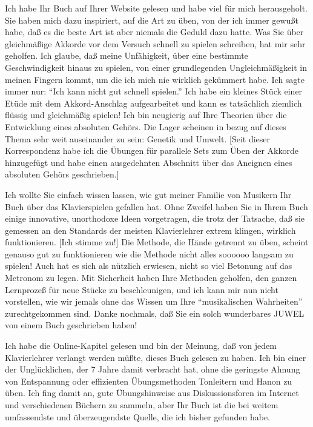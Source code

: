 \item \label{testimonials17}
Ich habe Ihr Buch auf Ihrer Website gelesen und habe viel für mich herausgeholt.
Sie haben mich dazu inspiriert, auf die Art zu üben, von der ich immer gewußt habe, daß es die beste Art ist aber niemals die Geduld dazu hatte.
Was Sie über gleichmäßige Akkorde vor dem Versuch schnell zu spielen schreiben, hat mir sehr geholfen.
Ich glaube, daß meine Unfähigkeit, über eine bestimmte Geschwindigkeit hinaus zu spielen, von einer grundlegenden Ungleichmäßigkeit in meinen Fingern kommt, um die ich mich nie wirklich gekümmert habe.
Ich sagte immer nur: \enquote{Ich kann nicht gut schnell spielen.}
Ich habe ein kleines Stück einer Etüde mit dem Akkord-Anschlag aufgearbeitet und kann es tatsächlich ziemlich flüssig und gleichmäßig spielen!
Ich bin neugierig auf Ihre Theorien über die Entwicklung eines absoluten Gehörs.
Die Lager scheinen in bezug auf dieses Thema sehr weit auseinander zu sein: Genetik und Umwelt.
[Seit dieser Korrespondenz habe ich die Übungen für parallele Sets zum Üben der Akkorde hinzugefügt und habe einen ausgedehnten Abschnitt über das Aneignen eines absoluten Gehörs geschrieben.]


\item \label{testimonials18}
Ich wollte Sie einfach wissen lassen, wie gut meiner Familie von Musikern Ihr Buch über das Klavierspielen gefallen hat.
Ohne Zweifel haben Sie in Ihrem Buch einige innovative, unorthodoxe Ideen vorgetragen, die trotz der Tatsache, daß sie gemessen an den Standards der meisten Klavierlehrer extrem klingen, wirklich funktionieren.
[Ich stimme zu!]
Die Methode, die Hände getrennt zu üben, scheint genauso gut zu funktionieren wie die Methode nicht alles soooooo langsam zu spielen!
Auch hat es sich als nützlich erwiesen, nicht so viel Betonung auf das Metronom zu legen.
Mit Sicherheit haben Ihre Methoden geholfen, den ganzen Lernprozeß für neue Stücke zu beschleunigen, und ich kann mir nun nicht vorstellen, wie wir jemals ohne das Wissen um Ihre \enquote{musikalischen Wahrheiten} zurechtgekommen sind.
Danke nochmals, daß Sie ein solch wunderbares JUWEL von einem Buch geschrieben haben!


\item \label{testimonials19}
Ich habe die Online-Kapitel gelesen und bin der Meinung, daß von jedem Klavierlehrer verlangt werden müßte, dieses Buch gelesen zu haben.
Ich bin einer der Unglücklichen, der 7 Jahre damit verbracht hat, ohne die geringste Ahnung von Entspannung oder effizienten Übungsmethoden Tonleitern und Hanon zu üben.
Ich fing damit an, gute Übungshinweise aus Diskussionsforen im Internet und verschiedenen Büchern zu sammeln, aber Ihr Buch ist die bei weitem umfassendste und überzeugendste Quelle, die ich bisher gefunden habe.


